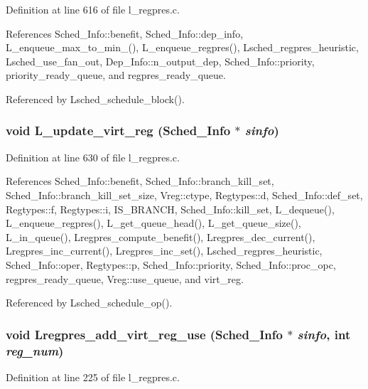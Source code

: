 Definition at line 616 of file l\_\-regpres.c.

References Sched\_\-Info::benefit, Sched\_\-Info::dep\_\-info, L\_\-enqueue\_\-max\_\-to\_\-min\_(), L\_\-enqueue\_\-regpres(), Lsched\_\-regpres\_\-heuristic, Lsched\_\-use\_\-fan\_\-out, Dep\_\-Info::n\_\-output\_\-dep, Sched\_\-Info::priority, priority\_\-ready\_\-queue, and regpres\_\-ready\_\-queue.

Referenced by Lsched\_\-schedule\_\-block().
\subsubsection{\setlength{\rightskip}{0pt plus 5cm}void L\_\-update\_\-virt\_\-reg (\bf{Sched\_\-Info} $\ast$ {\em sinfo})}\label{l__regpres_8c_1027a0a1f48301f97f9abb9dbf882368}




Definition at line 630 of file l\_\-regpres.c.

References Sched\_\-Info::benefit, Sched\_\-Info::branch\_\-kill\_\-set, Sched\_\-Info::branch\_\-kill\_\-set\_\-size, Vreg::ctype, Regtypes::d, Sched\_\-Info::def\_\-set, Regtypes::f, Regtypes::i, IS\_\-BRANCH, Sched\_\-Info::kill\_\-set, L\_\-dequeue(), L\_\-enqueue\_\-regpres(), L\_\-get\_\-queue\_\-head(), L\_\-get\_\-queue\_\-size(), L\_\-in\_\-queue(), Lregpres\_\-compute\_\-benefit(), Lregpres\_\-dec\_\-current(), Lregpres\_\-inc\_\-current(), Lregpres\_\-inc\_\-set(), Lsched\_\-regpres\_\-heuristic, Sched\_\-Info::oper, Regtypes::p, Sched\_\-Info::priority, Sched\_\-Info::proc\_\-opc, regpres\_\-ready\_\-queue, Vreg::use\_\-queue, and virt\_\-reg.

Referenced by Lsched\_\-schedule\_\-op().
\subsubsection{\setlength{\rightskip}{0pt plus 5cm}void Lregpres\_\-add\_\-virt\_\-reg\_\-use (\bf{Sched\_\-Info} $\ast$ {\em sinfo}, int {\em reg\_\-num})}\label{l__regpres_8c_b3b44eca744e1ff03be0b63846341219}




Definition at line 225 of file l\_\-regpres.c.

